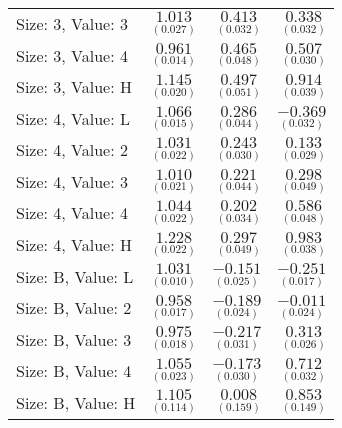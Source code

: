 \documentclass[a4paper]{article}
\begin{document}
\begin{center}
\begin{tabular}{lrrr}
Size: 3, Value: 3  & $\underset{(0.027)}{ 1.013}$ & $\underset{(0.032)}{ 0.413}$ & $\underset{(0.032)}{ 0.338}$\\ 
Size: 3, Value: 4  & $\underset{(0.014)}{ 0.961}$ & $\underset{(0.048)}{ 0.465}$ & $\underset{(0.030)}{ 0.507}$\\ 
Size: 3, Value: H  & $\underset{(0.020)}{ 1.145}$ & $\underset{(0.051)}{ 0.497}$ & $\underset{(0.039)}{ 0.914}$\\ 
\cmidrule{2-4}
Size: 4, Value: L  & $\underset{(0.015)}{ 1.066}$ & $\underset{(0.044)}{ 0.286}$ & $\underset{(0.032)}{-0.369}$\\ 
Size: 4, Value: 2  & $\underset{(0.022)}{ 1.031}$ & $\underset{(0.030)}{ 0.243}$ & $\underset{(0.029)}{ 0.133}$\\ 
Size: 4, Value: 3  & $\underset{(0.021)}{ 1.010}$ & $\underset{(0.044)}{ 0.221}$ & $\underset{(0.049)}{ 0.298}$\\ 
Size: 4, Value: 4  & $\underset{(0.022)}{ 1.044}$ & $\underset{(0.034)}{ 0.202}$ & $\underset{(0.048)}{ 0.586}$\\ 
Size: 4, Value: H  & $\underset{(0.022)}{ 1.228}$ & $\underset{(0.049)}{ 0.297}$ & $\underset{(0.038)}{ 0.983}$\\ 
\cmidrule{2-4}
Size: B, Value: L  & $\underset{(0.010)}{ 1.031}$ & $\underset{(0.025)}{-0.151}$ & $\underset{(0.017)}{-0.251}$\\ 
Size: B, Value: 2  & $\underset{(0.017)}{ 0.958}$ & $\underset{(0.024)}{-0.189}$ & $\underset{(0.024)}{-0.011}$\\ 
Size: B, Value: 3  & $\underset{(0.018)}{ 0.975}$ & $\underset{(0.031)}{-0.217}$ & $\underset{(0.026)}{ 0.313}$\\ 
Size: B, Value: 4  & $\underset{(0.023)}{ 1.055}$ & $\underset{(0.030)}{-0.173}$ & $\underset{(0.032)}{ 0.712}$\\ 
Size: B, Value: H  & $\underset{(0.114)}{ 1.105}$ & $\underset{(0.159)}{ 0.008}$ & $\underset{(0.149)}{ 0.853}$\\ 
\bottomrule \end{tabular}
\end{center}
\end{document}
